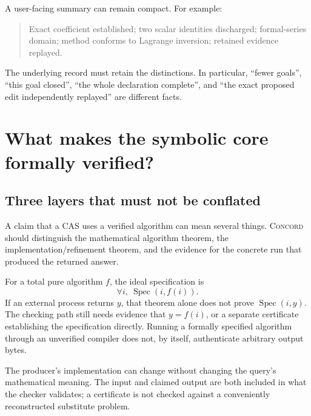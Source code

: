 \documentclass[11pt,a4paper]{article}
\newcommand{\Concord}{\textsc{Concord}}
\newcommand{\Spec}{\operatorname{Spec}}
\theoremstyle{definition}
\begin{document}
A user-facing summary can remain compact. For example:
\begin{quote}
Exact coefficient established; two scalar identities discharged; formal-series domain; method conforms to Lagrange inversion; retained evidence replayed.
\end{quote}
The underlying record must retain the distinctions. In particular, ``fewer goals'', ``this goal closed'', ``the whole declaration complete'', and ``the exact proposed edit independently replayed'' are different facts.

\section{What makes the symbolic core formally verified?}\label{sec:cas}

\subsection{Three layers that must not be conflated}
A claim that a CAS uses a verified algorithm can mean several things. \Concord{} should distinguish the mathematical algorithm theorem, the implementation/refinement theorem, and the evidence for the concrete run that produced the returned answer.

For a total pure algorithm \(f\), the ideal specification is
\[
  \forall i,\ \Spec(i,f(i)).
\]
If an external process returns \(y\), that theorem alone does not prove \(\Spec(i,y)\). The checking path still needs evidence that \(y=f(i)\), or a separate certificate establishing the specification directly. Running a formally specified algorithm through an unverified compiler does not, by itself, authenticate arbitrary output bytes.

\begin{center}
\end{center}
The producer's implementation can change without changing the query's mathematical meaning. The input and claimed output are both included in what the checker validates; a certificate is not checked against a conveniently reconstructed substitute problem.
\end{document}
